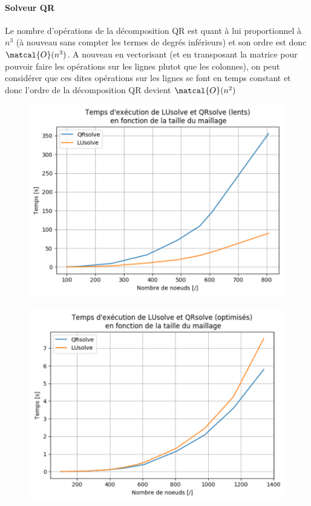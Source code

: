 \documentclass[11pt]{article}
\begin{document}
\paragraph{Solveur QR} Le nombre d'opérations de la décomposition QR est quant à lui proportionnel à $n^3$ (à nouveau sans compter les termes de degrés inférieurs) et son ordre est donc $\matcal{O}(n^3)$. A nouveau en vectorisant (et en transposant la matrice pour pouvoir faire les opérations sur les lignes plutot que les colonnes), on peut considérer que ces dites opérations sur les lignes se font en temps constant et donc l'ordre de la décomposition QR devient $\matcal{O}(n^2)$
\begin{figure}
    \begin{minipage}{0.45\linewidth}
    \includegraphics[width=\textwidth]{slow.png}
    \label{slow}
    \end{minipage}\hfill \begin{minipage}{0.46 \linewidth}
    \includegraphics[width=\textwidth]{opt.png}
    \label{opt}
    \end{minipage}\hfill 
\end{figure}
\end{document}
